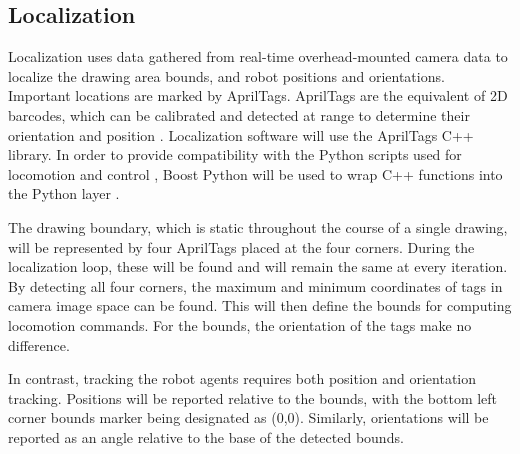 
\subsection{Localization}
\label{sec:software_localization}
Localization uses data gathered from real-time overhead-mounted camera data to localize the drawing area bounds, and robot positions and orientations. Important locations are marked by AprilTags. AprilTags are the equivalent of 2D barcodes, which can be calibrated and detected at range to determine their orientation and position \cite{apriltags}. Localization software will use the AprilTags C++ library. In order to provide compatibility with the Python scripts used for locomotion and control , Boost Python will be used to wrap C++ functions into the Python layer \cite{python_boost}.

The drawing boundary, which is static throughout the course of a single drawing, will be represented by four AprilTags placed at the four corners. During the localization loop, these will be found and will remain the same at every iteration. By detecting all four corners, the maximum and minimum coordinates of tags in camera image space can be found. This will then define the bounds for computing locomotion commands. For the bounds, the orientation of the tags make no difference.

In contrast, tracking the robot agents requires both position and orientation tracking. Positions will be reported relative to the bounds, with the bottom left corner bounds marker being designated as (0,0). Similarly, orientations will be reported as an angle relative to the base of the detected bounds.
